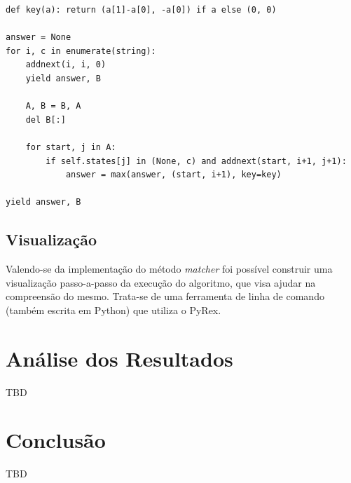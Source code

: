 \documentclass[a4paper,12pt,oneside,onecolumn]{uerj}
\begin{document}
\vspace{0.5cm}
\begin{lstlisting}[caption={Implementação do método \emph{matcher}},label=lst:matcher]
def key(a): return (a[1]-a[0], -a[0]) if a else (0, 0)

answer = None
for i, c in enumerate(string):
    addnext(i, i, 0)
    yield answer, B
    
    A, B = B, A
    del B[:]

    for start, j in A:
        if self.states[j] in (None, c) and addnext(start, i+1, j+1):
            answer = max(answer, (start, i+1), key=key)
            
yield answer, B
\end{lstlisting}

\section{Visualização}

Valendo-se da implementação do método \emph{matcher} foi possível construir uma visualização passo-a-passo da execução do algoritmo, que visa ajudar na compreensão do mesmo. Trata-se de uma ferramenta de linha de comando (também escrita em Python) que utiliza o PyRex.



\chapter{Análise dos Resultados}

TBD

\chapter{Conclusão}

TBD

\backmatter

\appendix

\label{app:full_source}
\end{document}
